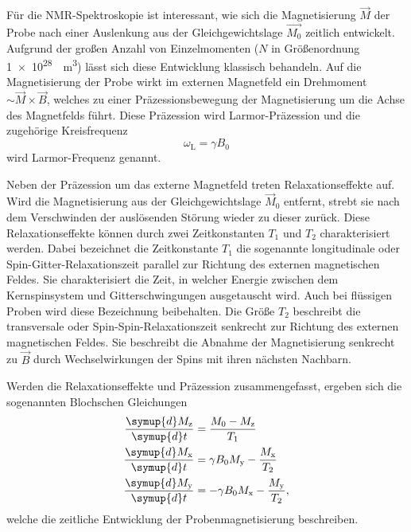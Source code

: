 Für die NMR-Spektroskopie ist interessant, wie sich die Magnetisierung $\vec{M}$
der Probe nach einer Auslenkung aus der Gleichgewichtslage $\vec{M_0}$
zeitlich entwickelt.
Aufgrund der großen Anzahl von Einzelmomenten
($N$ in Größenordnung \SI[retain-unity-mantissa=false]{1e28}{\per\cubic\meter})
lässt sich diese Entwicklung klassisch behandeln.
Auf die Magnetisierung der Probe wirkt im externen Magnetfeld ein Drehmoment
$\sim \vec{M} \times \vec{B}$,
welches zu einer Präzessionsbewegung der Magnetisierung um die Achse des
Magnetfelds führt.
Diese Präzession wird Larmor-Präzession und die zugehörige Kreisfrequenz
\begin{equation}
  \omega_\text{L} = \gamma B_0
  \label{eqn:LarmorFrequenz}
\end{equation}
wird Larmor-Frequenz genannt.

Neben der Präzession um das externe Magnetfeld treten Relaxationseffekte auf.
Wird die Magnetisierung aus der Gleichgewichtslage $\vec{M}_0$ entfernt,
strebt sie nach dem Verschwinden der auslösenden Störung wieder zu dieser zurück.
Diese Relaxationseffekte können durch zwei Zeitkonstanten $T_1$ und
$T_2$ charakterisiert werden.
Dabei bezeichnet die Zeitkonstante $T_1$ die sogenannte longitudinale oder
Spin-Gitter-Relaxationszeit parallel zur Richtung des externen magnetischen Feldes.
Sie charakterisiert die Zeit, in welcher Energie zwischen dem Kernspinsystem
und Gitterschwingungen ausgetauscht wird. Auch bei flüssigen Proben wird
diese Bezeichnung beibehalten.
Die Größe $T_2$ beschreibt die transversale oder Spin-Spin-Relaxationszeit
senkrecht zur Richtung des externen magnetischen Feldes.
Sie beschreibt die Abnahme der Magnetisierung senkrecht zu $\vec{B}$
durch Wechselwirkungen der Spins mit ihren nächsten Nachbarn.

Werden die Relaxationseffekte und Präzession zusammengefasst, ergeben sich
die sogenannten Blochschen Gleichungen
\begin{equation}
  \begin{split}
    \frac{\symup{d} M_\text{z}}{\symup{d} t} &= \frac{M_0 - M_\text{z}}{T_1} \\
    \frac{\symup{d} M_\text{x}}{\symup{d} t} &= 
      \gamma B_0 M_\text{y} - \frac{M_\text{x}}{T_2} \\
    \frac{\symup{d} M_\text{y}}{\symup{d} t} &=
      - \gamma B_0 M_\text{x} - \frac{M_\text{y}}{T_2},
  \end{split}
  \label{eqn:Bloch-Gleichungen}
\end{equation}
welche die zeitliche Entwicklung der Probenmagnetisierung beschreiben.



